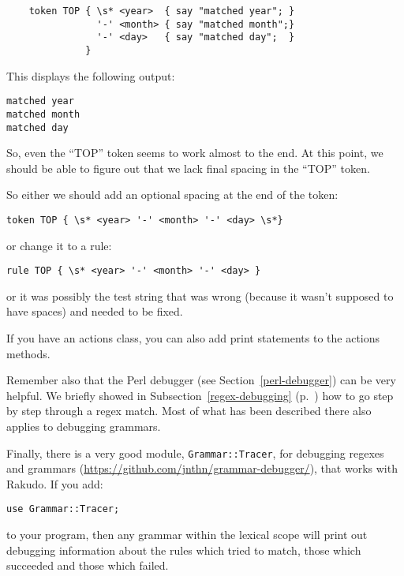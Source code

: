 \begin{verbatim}
    token TOP { \s* <year>  { say "matched year"; }
                '-' <month> { say "matched month";}
                '-' <day>   { say "matched day";  }
              }
\end{verbatim}
 
This displays the following output:

\begin{verbatim}
matched year
matched month
matched day
\end{verbatim}

So, even the ``TOP'' token seems to work almost to the end. At 
this point, we should be able to figure out that we lack 
final spacing in the ``TOP'' token. 

So either we should add an optional spacing at the end of 
the token:

\begin{verbatim}
token TOP { \s* <year> '-' <month> '-' <day> \s*}
\end{verbatim}

or change it to a rule:

\begin{verbatim}
rule TOP { \s* <year> '-' <month> '-' <day> }
\end{verbatim}

or it was possibly the test string that was wrong (because 
it wasn't supposed to have spaces) and needed to be fixed.

If you have an actions class, you can also add print statements 
to the actions methods.

Remember also that the Perl debugger (see 
Section~\ref{perl-debugger}) can be very helpful. We 
briefly showed in Subsection~\ref{regex-debugging} 
(p.~\pageref{regex-debugging}) how to go step by step 
through a regex match. Most of what has been described 
there also applies to debugging grammars.

Finally, there is a very good module, \verb'Grammar::Tracer', for 
debugging regexes and grammars (\url{https://github.com/jnthn/grammar-debugger/}), that works with Rakudo. If you add:

\begin{verbatim}
use Grammar::Tracer;
\end{verbatim}

to your program, then any grammar within the lexical scope will 
print out debugging information about the rules which tried to 
match, those which succeeded and those which failed.

